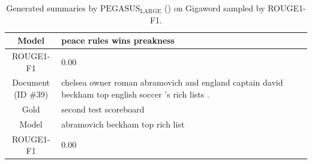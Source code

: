 \begin{table}[bth!]
\begin{tabular}{c|p{}}
\\ \hline
Model & 
peace rules wins preakness
\\ \hline
ROUGE1-F1 & 
0.00
\\ \hline
\makecell{Document\\(ID \#39)} & 
chelsea owner roman abramovich and england captain david beckham top english soccer 's rich lists .
\\ \hline
Gold & 
second test scoreboard
\\ \hline
Model & 
abramovich beckham top rich list
\\ \hline
ROUGE1-F1 & 
0.00
\\ \hline
\end{tabular}
\caption{Generated summaries by $\text{PEGASUS}_{\text{LARGE}}$ (\gnews) on Gigaword sampled by ROUGE1-F1.}
\end{table}
